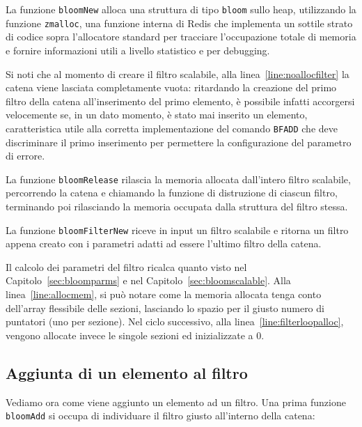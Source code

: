 

La funzione \verb|bloomNew| alloca una struttura di tipo \verb|bloom| sullo heap, utilizzando la
funzione \verb|zmalloc|, una funzione interna di Redis che implementa un sottile strato di codice
sopra l'allocatore standard per tracciare l'occupazione totale di memoria e fornire informazioni
utili a livello statistico e per debugging. 

Si noti che al momento di creare il filtro scalabile, alla linea~\ref{line:noallocfilter} la catena
viene lasciata completamente vuota: ritardando la creazione del primo filtro della catena
all'inserimento del primo elemento, è possibile infatti accorgersi velocemente se, in un dato
momento, è stato mai inserito un elemento, caratteristica utile alla corretta implementazione del
comando \verb|BFADD| che deve discriminare il primo inserimento per permettere la configurazione del
parametro di errore.

La funzione \verb|bloomRelease| rilascia la memoria allocata dall'intero filtro scalabile, percorrendo
la catena e chiamando la funzione di distruzione di ciascun filtro, terminando poi rilasciando la
memoria occupata dalla struttura del filtro stessa.



La funzione \verb|bloomFilterNew| riceve in input un filtro scalabile e ritorna un filtro appena
creato con i parametri adatti ad essere l'ultimo filtro della catena.

Il calcolo dei parametri del filtro ricalca quanto visto nel Capitolo~\ref{sec:bloomparms} e nel
Capitolo~\ref{sec:bloomscalable}. Alla linea~\ref{line:allocmem}, si può notare come la memoria
allocata tenga conto dell'array flessibile delle sezioni, lasciando lo spazio per il giusto numero
di puntatori (uno per sezione). Nel ciclo successivo, alla linea~\ref{line:filterloopalloc}, vengono
allocate invece le singole sezioni ed inizializzate a $0$.

\subsection{Aggiunta di un elemento al filtro}

Vediamo ora come viene aggiunto un elemento ad un filtro. Una prima funzione \verb|bloomAdd| si
occupa di individuare il filtro giusto all'interno della catena:

